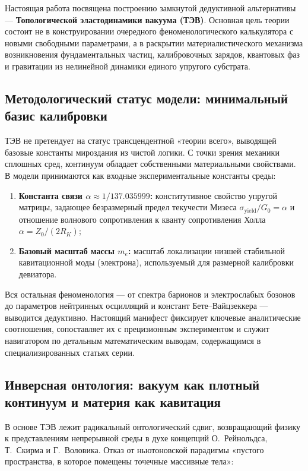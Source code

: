 \documentclass[11pt,a4paper]{article}
\theoremstyle{definition}
\theoremstyle{remark}
\begin{document}
Настоящая работа посвящена построению замкнутой дедуктивной альтернативы — \textbf{Топологической эластодинамики вакуума (ТЭВ)}. Основная цель теории состоит не в конструировании очередного феноменологического калькулятора с новыми свободными параметрами, а в раскрытии материалистического механизма возникновения фундаментальных частиц, калибровочных зарядов, квантовых фаз и гравитации из нелинейной динамики единого упругого субстрата.

\subsection{Методологический статус модели: минимальный базис калибровки}
ТЭВ не претендует на статус трансцендентной «теории всего», выводящей базовые константы мироздания из чистой логики. С точки зрения механики сплошных сред, континуум обладает собственными материальными свойствами. В модели принимаются как входные экспериментальные константы среды:
\begin{enumerate}
    \item \textbf{Константа связи $\alpha \approx 1/137.035999$:} конститутивное свойство упругой матрицы, задающее безразмерный предел текучести Мизеса $\sigma_{\mathrm{yield}}/G_0 = \alpha$ и отношение волнового сопротивления к кванту сопротивления Холла $\alpha = Z_0 / (2 R_K)$;
   \item \textbf{Базовый масштаб массы $m_e$:} масштаб локализации низшей стабильной кавитационной моды (электрона), используемый для размерной калибровки девиатора.
\end{enumerate}
Вся остальная феноменология — от спектра барионов и электрослабых бозонов до параметров нейтринных осцилляций и констант Бете--Вайцзеккера — выводится дедуктивно. Настоящий манифест фиксирует ключевые аналитические соотношения, сопоставляет их с прецизионным экспериментом и служит навигатором по детальным математическим выводам, содержащимся в специализированных статьях серии.

\subsection{Инверсная онтология: вакуум как плотный континуум и материя как кавитация}
В основе ТЭВ лежит радикальный онтологический сдвиг, возвращающий физику к представлениям непрерывной среды в духе концепций О.~Рейнольдса, Т.~Скирма и Г.~Воловика. Отказ от ньютоновской парадигмы «пустого пространства, в которое помещены точечные массивные тела»:
\end{document}

